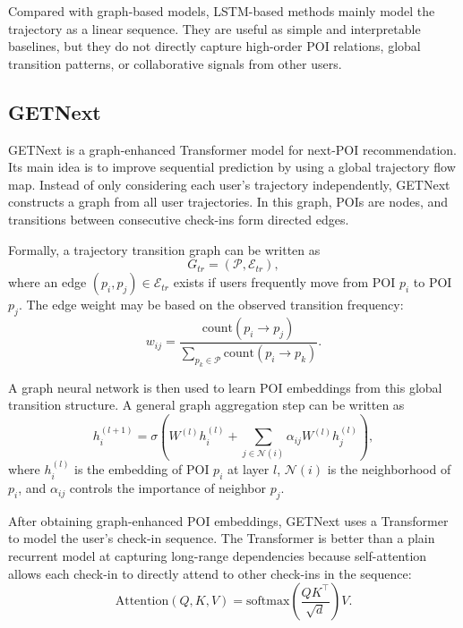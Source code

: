 \documentclass[12pt, journal]{IEEEtran}
\begin{document}
Compared with graph-based models, LSTM-based methods mainly model the trajectory as a linear sequence. They are useful as simple and interpretable baselines, but they do not directly capture high-order POI relations, global transition patterns, or collaborative signals from other users.

\subsection{GETNext}

GETNext \cite{yang2022getnext} is a graph-enhanced Transformer model for next-POI recommendation. Its main idea is to improve sequential prediction by using a global trajectory flow map. Instead of only considering each user's trajectory independently, GETNext constructs a graph from all user trajectories. In this graph, POIs are nodes, and transitions between consecutive check-ins form directed edges.

Formally, a trajectory transition graph can be written as
\begin{equation}
    G_{tr} = (\mathcal{P}, \mathcal{E}_{tr}),
\end{equation}
where an edge $(p_i,p_j) \in \mathcal{E}_{tr}$ exists if users frequently move from POI $p_i$ to POI $p_j$. The edge weight may be based on the observed transition frequency:
\begin{equation}
    w_{ij} = \frac{\mathrm{count}(p_i \rightarrow p_j)}
    {\sum_{p_k \in \mathcal{P}} \mathrm{count}(p_i \rightarrow p_k)}.
\end{equation}

A graph neural network is then used to learn POI embeddings from this global transition structure. A general graph aggregation step can be written as
\begin{equation}
    h_i^{(l+1)} = \sigma \left( W^{(l)} h_i^{(l)} +
    \sum_{j \in \mathcal{N}(i)} \alpha_{ij} W^{(l)} h_j^{(l)} \right),
\end{equation}
where $h_i^{(l)}$ is the embedding of POI $p_i$ at layer $l$, $\mathcal{N}(i)$ is the neighborhood of $p_i$, and $\alpha_{ij}$ controls the importance of neighbor $p_j$.

After obtaining graph-enhanced POI embeddings, GETNext uses a Transformer to model the user's check-in sequence. The Transformer is better than a plain recurrent model at capturing long-range dependencies because self-attention allows each check-in to directly attend to other check-ins in the sequence:
\begin{equation}
    \mathrm{Attention}(Q,K,V) =
    \mathrm{softmax}\left(\frac{QK^\top}{\sqrt{d}}\right)V.
\end{equation}
\end{document}
